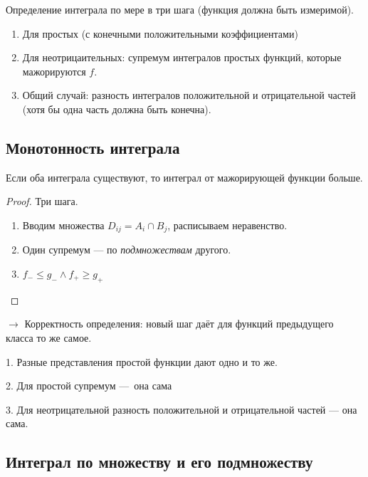 \documentclass[12pt, a4paper, oneside]{memoir}
\begin{document}
Определение интеграла по мере в три шага (функция должна быть измеримой). 

\begin{enumerate}
    \item Для простых (с конечными положительными коэффициентами)
    \item Для неотрицаительных: супремум интегралов простых функций, которые мажорируются $f$.
    \item Общий случай: разность интегралов положительной и отрицательной частей (хотя бы одна часть должна быть конечна).
\end{enumerate}


\subsection{Монотонность интеграла}

\begin{theorem}
    Если оба интеграла существуют, то интеграл от мажорирующей функции больше.

    \begin{proof}
        Три шага.

        \begin{enumerate}
            \item Вводим множества $D_{ij} = A_i \cap B_j$, расписываем неравенство.
            \item Один супремум — по \textit{подмножествам} другого.
            \item $f_{-} \leqslant g_{-} \land f_{+} \geqslant g_{+}$
        \end{enumerate}
    \end{proof}
\end{theorem}

$→$ Корректность определения: новый шаг даёт для функций предыдущего класса то же самое.

1. Разные представления простой функции дают одно и то же.

2. Для простой супремум — она сама

3. Для неотрицательной разность положительной и отрицательной частей — она сама.




\subsection{Интеграл по множеству и его подмножеству}
\end{document}
